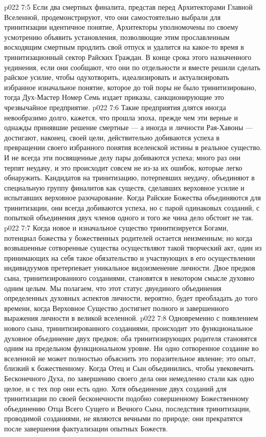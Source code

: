\vs p022 7:5 Если два смертных финалита, представ перед Архитекторами Главной Вселенной, продемонстрируют, что они самостоятельно выбрали для тринитизации идентичное понятие, Архитекторы уполномочены по своему усмотрению объявить установления, позволяющие этим прославленным восходящим смертным продлить свой отпуск и удалится на какое\hyp{}то время в тринитизационный сектор Райских Граждан. В конце срока этого назначенного уединения, если они сообщают, что они по отдельности и вместе решили сделать райское усилие, чтобы одухотворить, идеализировать и актуализировать избранное изначальное понятие, которое до той поры не было тринитизировано, тогда Дух\hyp{}Мастер Номер Семь издает приказы, санкционирующие это чрезвычайное предприятие.
\vs p022 7:6 Такие предприятия длятся иногда невообразимо долго, кажется, что прошла эпоха, прежде чем эти верные и однажды принявшие решение смертные --- а иногда и личности Рая\hyp{}Хавоны --- достигают, наконец, своей цели, действительно добиваются успеха в превращении своего избранного понятия вселенской истины в реальное существо. И не всегда эти посвященные делу пары добиваются успеха; много раз они терпят неудачу, и это происходит совсем не из\hyp{}за их ошибок, которые легко обнаружить. Кандидатов на тринитизацию, потерпевших неудачу, объединяют в специальную группу финалитов как существ, сделавших верховное усилие и испытавших верховное разочарование. Когда Райские Божества объединяются для тринитизации, они всегда добиваются успеха, но с парой одинаковых созданий, с попыткой объединения двух членов одного и того же чина дело обстоит не так.
\vs p022 7:7 \pc Когда новое и изначальное существо тринитизируется Богами, потенциал божества у божественных родителей остается неизменным; но когда возвышенные сотворенные существа осуществляют такой творческий акт, один из принимающих на себя такое обязательство и участвующих в его осуществлении индивидуумов претерпевает уникальное видоизменение личности. Двое предков сына, тринитизированного созданиями, становятся в некотором смысле духовно одним целым. Мы полагаем, что этот статус двуединого объединения определенных духовных аспектов личности, вероятно, будет преобладать до того времени, когда Верховное Существо достигнет полного и завершенного выражения личности в великой вселенной.
\vs p022 7:8 Одновременно с появлением нового сына, тринитизированного созданиями, происходит это функциональное духовное объединение двух предков; оба тринитизирующих родителя становятся одним на предельном функциональном уровне. Ни одно сотворенное создание во вселенной не может полностью объяснить это поразительное явление; это опыт, близкий к божественному. Когда Отец и Сын объединились, чтобы увековечить Бесконечного Духа, по завершению своего дела они немедленно стали как одно целое, и с тех пор они есть одно. Хотя объединение двух созданий для тринитизации по своей бесконечности подобно совершенному Божественному объединению Отца Всего Сущего и Вечного Сына, последствия тринитизации, проводимой созданиями, не являются вечными по природе; они прекратятся после завершения фактуализации опытных Божеств.
